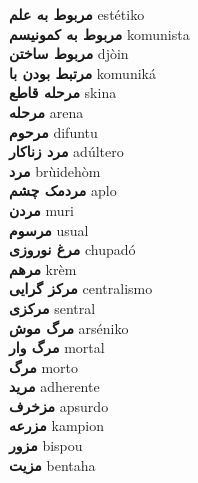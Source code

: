 \textbf{ مربوط به علم  } estétiko \\
\textbf{ مربوط به کمونیسم  } komunista \\
\textbf{ مربوط ساختن  } djòin \\
\textbf{ مرتبط بودن با  } komuniká \\
\textbf{ مرحله قاطع  } skina \\
\textbf{ مرحله  } arena \\
\textbf{ مرحوم  } difuntu \\
\textbf{ مرد زناکار  } adúltero \\
\textbf{ مرد  } brùidehòm \\
\textbf{ مردمک چشم  } aplo \\
\textbf{ مردن  } muri \\
\textbf{ مرسوم  } usual \\
\textbf{ مرغ نوروزی  } chupadó \\
\textbf{ مرهم  } krèm \\
\textbf{ مرکز گرایی  } centralismo \\
\textbf{ مرکزی  } sentral \\
\textbf{ مرگ موش  } arséniko \\
\textbf{ مرگ وار  } mortal \\
\textbf{ مرگ  } morto \\
\textbf{ مرید  } adherente \\
\textbf{ مزخرف  } apsurdo \\
\textbf{ مزرعه  } kampion \\
\textbf{ مزور  } bispou \\
\textbf{ مزیت  } bentaha \\
